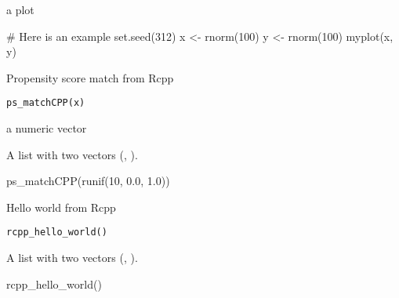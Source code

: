 \documentclass[a4paper]{book}
\begin{document}
%
\begin{Value}
a plot
\end{Value}
%
\begin{Examples}
\begin{ExampleCode}
# Here is an example
set.seed(312)
x <- rnorm(100)
y <- rnorm(100)
myplot(x, y)

\end{ExampleCode}
\end{Examples}
%
\begin{Description}
Propensity score match from Rcpp
\end{Description}
%
\begin{Usage}
\begin{verbatim}
ps_matchCPP(x)
\end{verbatim}
\end{Usage}
%
\begin{Arguments}
\begin{ldescription}
\item[\code{x}] a numeric vector
\end{ldescription}
\end{Arguments}
%
\begin{Value}
A list with two vectors (, ).
\end{Value}
%
\begin{Examples}
\begin{ExampleCode}
ps_matchCPP(runif(10, 0.0, 1.0))
\end{ExampleCode}
\end{Examples}
%
\begin{Description}
Hello world from Rcpp
\end{Description}
%
\begin{Usage}
\begin{verbatim}
rcpp_hello_world()
\end{verbatim}
\end{Usage}
%
\begin{Value}
A list with two vectors (, ).
\end{Value}
%
\begin{Examples}
\begin{ExampleCode}
rcpp_hello_world()
\end{ExampleCode}
\end{Examples}
\printindex{}
\end{document}
